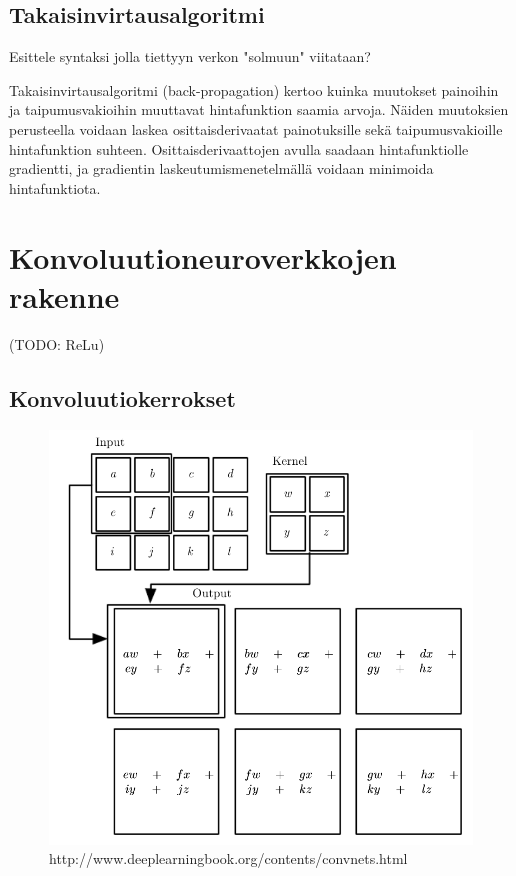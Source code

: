 \documentclass[finnish]{tktltiki2}
\theoremstyle{definition}
\theoremstyle{remark}
\begin{document}
  \subsection{Takaisinvirtausalgoritmi}

  Esittele syntaksi jolla tiettyyn verkon "solmuun" viitataan?

  Takaisinvirtausalgoritmi (back-propagation) kertoo kuinka muutokset painoihin ja taipumusvakioihin muuttavat hintafunktion saamia arvoja. Näiden muutoksien perusteella voidaan laskea osittaisderivaatat painotuksille sekä taipumusvakioille hintafunktion suhteen. Osittaisderivaattojen avulla saadaan hintafunktiolle gradientti, ja gradientin laskeutumismenetelmällä voidaan minimoida hintafunktiota.
  

  \section{Konvoluutioneuroverkkojen rakenne}
  (TODO: ReLu)
  \subsection{Konvoluutiokerrokset}

  \begin{figure}[h]
  \label{pic:convolution}
  \centering
  \includegraphics[scale=0.4]{convolution}
  \caption{http://www.deeplearningbook.org/contents/convnets.html}
  \end{figure}
\end{document}

